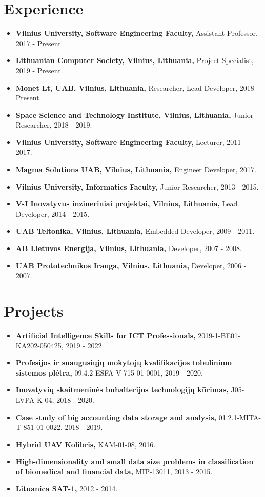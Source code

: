 \documentclass[a4paper,11pt]{article}
\newcommand{\resumeItem}[2]{
  \item\small{
    \textbf{#1}{ #2 \vspace{-2pt}}
  }
}
\newcommand{\resumeSubItem}[2]{\resumeItem{#1}{#2}\vspace{-4pt}}
\newcommand{\resumeSubHeadingListStart}{\begin{itemize}[leftmargin=*] \renewcommand\labelitemi{$\circ$}}
\newcommand{\resumeSubHeadingListEnd}{\end{itemize}}
\begin{document}
\section{Experience}
  \resumeSubHeadingListStart
    \resumeSubItem{Vilnius University, Software Engineering Faculty,}{Assistant Professor, 2017 - Present.}
    \resumeSubItem{Lithuanian Computer Society, Vilnius, Lithuania,}{Project Specialist, 2019 - Present.}
    \resumeSubItem{Monet Lt, UAB, Vilnius, Lithuania,}{Researcher, Lead Developer, 2018 - Present.}
    \resumeSubItem{Space Science and Technology Institute, Vilnius, Lithuania,}{Junior Researcher, 2018 - 2019.}
    \resumeSubItem{Vilnius University, Software Engineering Faculty,}{Lecturer, 2011 - 2017.}
    \resumeSubItem{Magma Solutions UAB, Vilnius, Lithuania,}{Engineer Developer, 2017.}
    \resumeSubItem{Vilnius University, Informatics Faculty,}{Junior Researcher, 2013 - 2015.}
    \resumeSubItem{VsI Inovatyvus inzineriniai projektai, Vilnius, Lithuania,}{Lead Developer, 2014 - 2015.}
    \resumeSubItem{UAB Teltonika, Vilnius, Lithuania,}{Embedded Developer, 2009 - 2011.}
    \resumeSubItem{AB Lietuvos Energija, Vilnius, Lithuania,}{Developer, 2007 - 2008.}
    \resumeSubItem{UAB Prototechnikos Iranga, Vilnius, Lithuania,}{Developer, 2006 - 2007.}
  \resumeSubHeadingListEnd
\vspace{-15pt}
\section{Projects}
  \resumeSubHeadingListStart
    \resumeSubItem{Artificial Intelligence Skills for ICT Professionals,}{2019-1-BE01-KA202-050425, 2019 - 2022.}
    \resumeSubItem{Profesijos ir suaugusiųjų mokytojų kvalifikacijos tobulinimo sistemos plėtra,}{09.4.2-ESFA-V-715-01-0001, 2019 - 2020.}
    \resumeSubItem{Inovatyvių skaitmeninės buhalterijos technologijų kūrimas,}{J05-LVPA-K-04, 2018 - 2020.}
    \resumeSubItem{Case study of big accounting data storage and analysis,}{01.2.1-MITA-T-851-01-0022, 2018 - 2019.}
    \resumeSubItem{Hybrid UAV Kolibris,}{KAM-01-08, 2016.}
    \resumeSubItem{High-dimensionality and small data size problems in classification of biomedical and financial data,}{MIP-13011, 2013 - 2015.}
    \resumeSubItem{Lituanica SAT-1,}{2012 - 2014.}
  \resumeSubHeadingListEnd
\vspace{-15pt}
\end{document}
